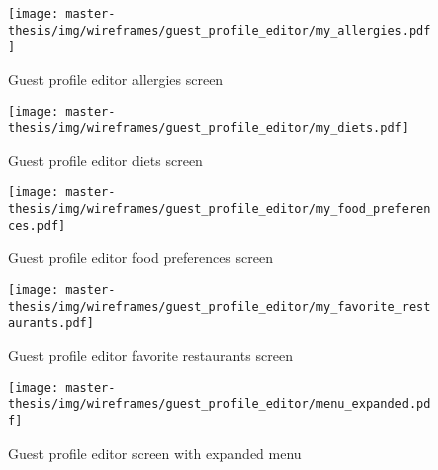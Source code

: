 \begin{figure}[h]
  \centering
  \texttt{[image: master-thesis/img/wireframes/guest\_profile\_editor/my\_allergies.pdf]}
  \caption{Guest profile editor allergies screen}
\end{figure}

\begin{figure}[h]
  \centering
  \texttt{[image: master-thesis/img/wireframes/guest\_profile\_editor/my\_diets.pdf]}
  \caption{Guest profile editor diets screen}
\end{figure}

\begin{figure}[h]
  \centering
  \texttt{[image: master-thesis/img/wireframes/guest\_profile\_editor/my\_food\_preferences.pdf]}
  \caption{Guest profile editor food preferences screen}
\end{figure}

\begin{figure}[h]
  \centering
  \texttt{[image: master-thesis/img/wireframes/guest\_profile\_editor/my\_favorite\_restaurants.pdf]}
  \caption{Guest profile editor favorite restaurants screen}
\end{figure}

\begin{figure}[h]
  \centering
  \texttt{[image: master-thesis/img/wireframes/guest\_profile\_editor/menu\_expanded.pdf]}
  \caption{Guest profile editor screen with expanded menu}
\end{figure}

\listoftodos